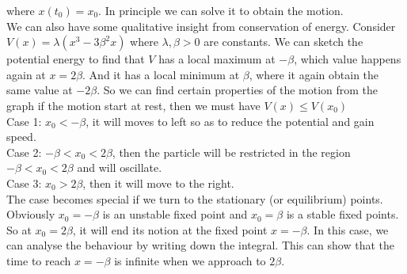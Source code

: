 where $x(t_0)=x_0$.
In principle we can solve it to obtain the motion.\\
We can also have some qualitative insight from conservation of energy.
Consider $V(x)=\lambda(x^3-3\beta^2x)$ where $\lambda,\beta>0$ are constants.
We can sketch the potential energy to find that $V$ has a local maximum at $-\beta$, which value happens again at $x=2\beta$.
And it has a local minimum at $\beta$, where it again obtain the same value at $-2\beta$.
So we can find certain properties of the motion from the graph if the motion start at rest, then we must have $V(x)\le V(x_0)$\\
Case 1: $x_0<-\beta$, it will moves to left so as to reduce the potential and gain speed.\\
Case 2: $-\beta<x_0<2\beta$, then the particle will be restricted in the region $-\beta<x_0<2\beta$ and will oscillate.\\
Case 3: $x_0>2\beta$, then it will move to the right.\\
The case becomes special if we turn to the stationary (or equilibrium) points.
Obviously $x_0=-\beta$ is an unstable fixed point and $x_0=\beta$ is a stable fixed points.
So at $x_0=2\beta$, it will end its notion at the fixed point $x=-\beta$.
In this case, we can analyse the behaviour by writing down the integral.
This can show that the time to reach $x=-\beta$ is infinite when we approach to $2\beta$.

